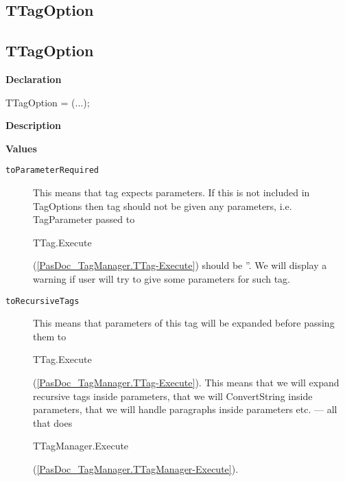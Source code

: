 \documentclass{report}
\newif\ifpdf
\begin{document}
\subsection*{\large{\textbf{TTagOption}}\normalsize\hspace{1ex}\hrulefill}
\else
\subsection*{TTagOption}
\fi
\label{PasDoc_TagManager-TTagOption}
\begin{list}{}{
\setlength{\itemindent}{0cm}
\setlength{\listparindent}{0cm}
\setlength{\leftmargin}{\evensidemargin}
\addtolength{\leftmargin}{\tmplength}
\settowidth{\labelsep}{X}
\addtolength{\leftmargin}{\labelsep}
\setlength{\labelwidth}{\tmplength}
}
\item[\textbf{Declaration}\hfill]
\ifpdf
\begin{flushleft}
\fi
\begin{ttfamily}
TTagOption = (...);\end{ttfamily}

\ifpdf
\end{flushleft}
\fi

\par
\item[\textbf{Description}]
 \item[\textbf{Values}]
\begin{description}
\item[\texttt{toParameterRequired}] \label{PasDoc_TagManager-toParameterRequired}
\index{}
This means that tag expects parameters. If this is not included in TagOptions then tag should not be given any parameters, i.e. TagParameter passed to \begin{ttfamily}TTag.Execute\end{ttfamily}(\ref{PasDoc_TagManager.TTag-Execute}) should be ''. We will display a warning if user will try to give some parameters for such tag.
\item[\texttt{toRecursiveTags}] \label{PasDoc_TagManager-toRecursiveTags}
\index{}
This means that parameters of this tag will be expanded before passing them to \begin{ttfamily}TTag.Execute\end{ttfamily}(\ref{PasDoc_TagManager.TTag-Execute}). This means that we will expand recursive tags inside parameters, that we will ConvertString inside parameters, that we will handle paragraphs inside parameters etc. --- all that does \begin{ttfamily}TTagManager.Execute\end{ttfamily}(\ref{PasDoc_TagManager.TTagManager-Execute}).


\end{description}
\end{list}
\end{document}

